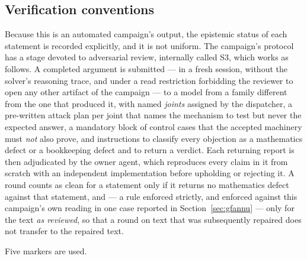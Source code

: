 \documentclass[11pt]{article}
\theoremstyle{plain}
\theoremstyle{definition}
\theoremstyle{remark}
\numberwithin{equation}{section}
\begin{document}
\subsection{Verification conventions}\label{sec:conventions}

Because this is an automated campaign's output, the epistemic status of each statement is
recorded explicitly, and it is not uniform. The campaign's protocol has a stage devoted to
adversarial review, internally called S3, which works as follows. A completed argument is
submitted --- in a fresh session, without the solver's reasoning trace, and under a read
restriction forbidding the reviewer to open any other artifact of the campaign --- to a
model from a family different from the one that produced it, with named \emph{joints}
assigned by the dispatcher, a pre-written attack plan per joint that names the mechanism to
test but never the expected answer, a mandatory block of control cases that the accepted
machinery must \emph{not} also prove, and instructions to classify every objection as a
mathematics defect or a bookkeeping defect and to return a verdict. Each returning report is
then adjudicated by the owner agent, which reproduces every claim in it from scratch with an
independent implementation before upholding or rejecting it. A round counts as clean for a
statement only if it returns no mathematics defect against that statement, and --- a rule
enforced strictly, and enforced against this campaign's own reading in one case reported in
Section~\ref{sec:gfannu} --- only for the text \emph{as reviewed}, so that a round on text
that was subsequently repaired does not transfer to the repaired text.

Five markers are used.
\end{document}
